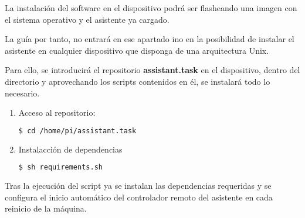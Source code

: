 La instalación del software en el dispositivo podrá ser flasheando una imagen con el sistema operativo y el asistente ya cargado.

La guía por tanto, no entrará en ese apartado ino en la posibilidad de instalar el asistente en cualquier dispositivo que disponga de una arquitectura Unix.

Para ello, se introducirá el repositorio \textbf{assistant.task} en el dispositivo, dentro del directorio \text y aprovechando los scripts contenidos en él, se instalará todo lo necesario.

\begin{enumerate}
    \item Acceso al repositorio:
    
        \begin{lstlisting}[language=bash]
            $ cd /home/pi/assistant.task
        \end{lstlisting}
    
    \item Instalacción de dependencias
    
        \begin{lstlisting}[language=bash]
            $ sh requirements.sh
        \end{lstlisting}
    
\end{enumerate}

Tras la ejecución del script ya se instalan las dependencias requeridas y se configura el inicio automático del controlador remoto del asistente en cada reinicio de la máquina.
